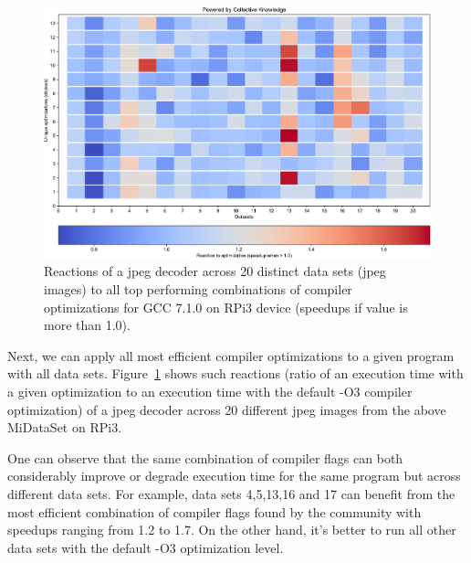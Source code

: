    \begin{figure}[!htbp]
     \centering
      \includegraphics[width=5.8in]
      {ck-assets/9f93e8520adbea97-cropped.pdf} %
     \caption{
       Reactions of a jpeg decoder across 20 distinct data sets (jpeg images)
       to all top performing combinations of compiler optimizations
       for GCC 7.1.0 on RPi3 device (speedups if value is more than 1.0).
     }                                         
     \label{fig:ck-datasets-jpeg-d-reactions}
   \end{figure}

Next, we can apply all most efficient compiler optimizations 
to a given program with all data sets.
%
Figure~\ref{fig:ck-datasets-jpeg-d-reactions} shows such reactions 
(ratio of an execution time with a given optimization to an execution time 
with the default -O3 compiler optimization) of a jpeg decoder across 
20 different jpeg images from the above MiDataSet on RPi3.

One can observe that the same combination of compiler flags can both
considerably improve or degrade execution time for the same program
but across different data sets.
%
For example, data sets 4,5,13,16 and 17 can benefit from the most
efficient combination of compiler flags found by the community
with speedups ranging from 1.2 to 1.7.
%
On the other hand, it's better to run all other data sets with
the default -O3 optimization level.

